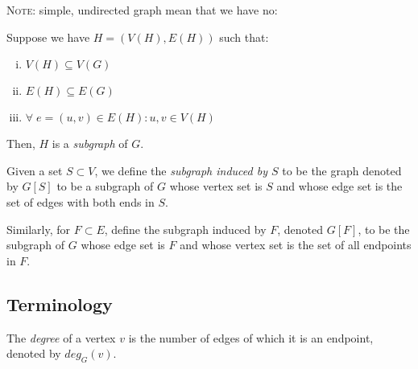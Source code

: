 \documentclass[11pt, letterpaper, oneside]{article}
\begin{document}
\textsc{Note}: simple, undirected graph mean that we have no: \nopagebreak
\begin{figure}[H]
	\centering
	\setcounter{subfigure}{0}
	 \hspace*{2cm}
	 \hspace*{2cm}
\end{figure}

Suppose we have $H=(V(H), E(H))$ such that:
\begin{enumerate}[i)]
	\item $V(H) \subseteq V(G)$
	\item $E(H) \subseteq E(G)$
	\item $\forall \; e=(u,v) \in E(H): u, v \in V(H)$
\end{enumerate}

Then, $H$ is a \textit{subgraph} of $G$.

Given a set $S \subset V$, we define the \textit{subgraph induced by $S$} to be the graph denoted by $G[S]$ to be a subgraph of $G$ whose vertex set is $S$ and whose edge set is the set of edges with both ends in $S$.

Similarly, for $F \subset E$, define the subgraph induced by $F$, denoted $G[F]$, to be the subgraph of $G$ whose edge set is $F$ and whose vertex set is the set of all endpoints in $F$.


\subsection{Terminology}
The \textit{degree} of a vertex $v$ is the number of edges of which it is an endpoint, denoted by $deg_G(v)$.
\end{document}
